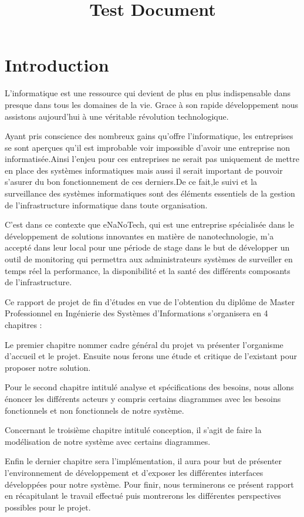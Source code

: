 \documentclass{report}
\begin{document}
\title{Test Document}
\maketitle

\section{Introduction}
L’informatique est une ressource qui devient de plus en plus indispensable dans 
presque dans tous les domaines de la vie. Grace à son rapide développement 
nous assistons aujourd’hui à une véritable révolution technologique.

Ayant pris conscience des nombreux gains qu’offre l’informatique, les entreprises se sont 
aperçues qu’il est improbable voir impossible d’avoir une entreprise non informatisée.Ainsi l'enjeu pour ces entreprises ne serait pas uniquement de mettre en place des systèmes informatiques mais aussi il serait important de pouvoir s'asurer du bon fonctionnement de ces derniers.De ce fait,le suivi et la surveillance des systèmes informatiques sont des éléments essentiels de la gestion de l'infrastructure informatique dans toute organisation. 

C’est dans ce contexte que eNaNoTech, qui est une entreprise spécialisée dans le développement de solutions innovantes en matière de nanotechnologie, m’a accepté dans leur local pour une période de stage dans le but de développer un outil de monitoring qui permettra aux administrateurs systèmes de surveiller en temps réel la performance, la disponibilité et la santé des différents composants de l'infrastructure.

Ce rapport de projet de fin d’études en vue de l’obtention du diplôme de Master Professionnel
en Ingénierie des Systèmes d’Informations s’organisera en 4 chapitres : 

Le premier chapitre nommer cadre général du projet va présenter l’organisme d’accueil et le 
projet. Ensuite nous ferons une étude et critique de l’existant pour proposer notre solution. 

Pour le second chapitre intitulé analyse et spécifications des besoins, nous allons énoncer les 
différents acteurs y compris certains diagrammes avec les besoins fonctionnels et non 
fonctionnels de notre système.

Concernant le troisième chapitre intitulé conception, il s’agit de faire la modélisation de notre 
système avec certains diagrammes.

Enfin le dernier chapitre sera l’implémentation, il aura pour but de présenter l’environnement 
de développement et d’exposer les différentes interfaces développées pour notre système.
Pour finir, nous terminerons ce présent rapport en récapitulant le travail effectué puis 
montrerons les différentes perspectives possibles pour le projet.
\end{document}
